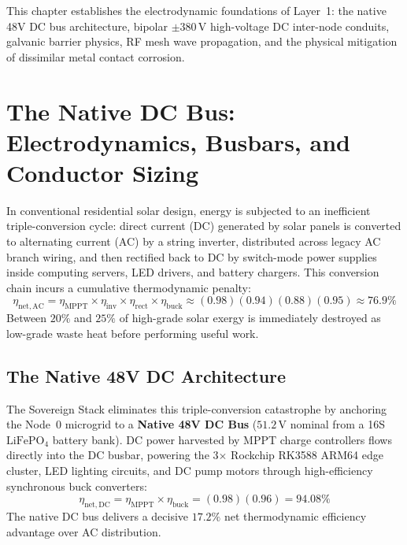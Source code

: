 This chapter establishes the electrodynamic foundations of Layer~1: the native 48V DC bus architecture, bipolar $\pm 380\,\mathrm{V}$ high-voltage DC inter-node conduits, galvanic barrier physics, RF mesh wave propagation, and the physical mitigation of dissimilar metal contact corrosion.

\section{The Native DC Bus: Electrodynamics, Busbars, and Conductor Sizing}
\label{sec:em_dc_bus}

In conventional residential solar design, energy is subjected to an inefficient triple-conversion cycle: direct current (DC) generated by solar panels is converted to alternating current (AC) by a string inverter, distributed across legacy AC branch wiring, and then rectified back to DC by switch-mode power supplies inside computing servers, LED drivers, and battery chargers. This conversion chain incurs a cumulative thermodynamic penalty:
\begin{equation}
\eta_{\mathrm{net, AC}} = \eta_{\mathrm{MPPT}} \times \eta_{\mathrm{inv}} \times \eta_{\mathrm{rect}} \times \eta_{\mathrm{buck}} \approx (0.98)(0.94)(0.88)(0.95) \approx 76.9\%
\label{eq:ac_triple_conversion}
\end{equation}
Between $20\%$ and $25\%$ of high-grade solar exergy is immediately destroyed as low-grade waste heat before performing useful work.

\subsection{The Native 48V DC Architecture}
The Sovereign Stack eliminates this triple-conversion catastrophe by anchoring the Node~0 microgrid to a \textbf{Native 48V DC Bus} ($51.2\,\mathrm{V}$ nominal from a 16S $\mathrm{LiFePO}_4$ battery bank). DC power harvested by MPPT charge controllers flows directly into the DC busbar, powering the 3$\times$ Rockchip RK3588 ARM64 edge cluster, LED lighting circuits, and DC pump motors through high-efficiency synchronous buck converters:
\begin{equation}
\eta_{\mathrm{net, DC}} = \eta_{\mathrm{MPPT}} \times \eta_{\mathrm{buck}} = (0.98)(0.96) = 94.08\%
\label{eq:dc_native_efficiency}
\end{equation}
The native DC bus delivers a decisive $17.2\%$ net thermodynamic efficiency advantage over AC distribution.

